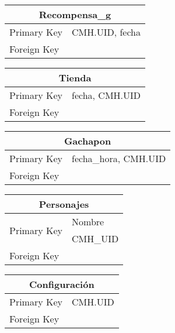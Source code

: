 \documentclass{report}
\begin{document}
\begin{center}    
    \begin{tabular}{|p{3cm}|p{5cm}|}
    \hline
    \multicolumn{2}{|c|}{Recompensa\_g} \\ 
    \hline
    \hline
    Primary Key& CMH.UID, fecha\\ 
    \hline
    Foreign Key &\\ 
    \hline
    \end{tabular}
\end{center}

\begin{center}    
    \begin{tabular}{|p{3cm}|p{5cm}|}
    \hline
    \multicolumn{2}{|c|}{Tienda} \\ 
    \hline
    \hline
    Primary Key& fecha, CMH.UID\\ 
    \hline
    Foreign Key &\\ 
    \hline
    \end{tabular}
\end{center}

\begin{center}    
    \begin{tabular}{|p{3cm}|p{5cm}|}
    \hline
    \multicolumn{2}{|c|}{Gachapon} \\ 
    \hline
    \hline
    Primary Key& fecha\_hora, CMH.UID\\ 
    \hline
    Foreign Key &\\ 
    \hline
    \end{tabular}
\end{center}

\begin{center}    
    \begin{tabular}{|p{3cm}|p{5cm}|}
    \hline
    \multicolumn{2}{|c|}{Personajes} \\ 
    \hline
    \hline
    \multirow{2}{4em}{Primary Key}& Nombre\\ & CMH\_UID\\ 
    \hline
    Foreign Key &\\ 
    \hline
    \end{tabular}
\end{center}

\begin{center}    
    \begin{tabular}{|p{3cm}|p{5cm}|}
    \hline
    \multicolumn{2}{|c|}{Configuración} \\ 
    \hline
    \hline
    Primary Key& CMH.UID\\ 
    \hline
    Foreign Key &\\ 
    \hline
    \end{tabular}
\end{center}
\end{document}
